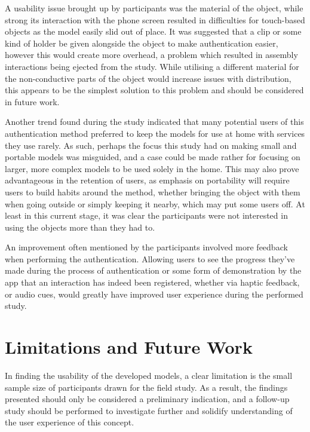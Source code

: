 \documentclass{l4proj}
\begin{document}
A usability issue brought up by participants was the material of the object, while strong its interaction with the phone screen resulted in difficulties for touch-based objects as the model easily slid out of place. It was suggested that a clip or some kind of holder be given alongside the object to make authentication easier, however this would create more overhead, a problem which resulted in assembly interactions being ejected from the study. While utilising a different material for the non-conductive parts of the object would increase issues with distribution, this appears to be the simplest solution to this problem and should be considered in future work.

Another trend found during the study indicated that many potential users of this authentication method preferred to keep the models for use at home with services they use rarely. As such, perhaps the focus this study had on making small and portable models was misguided, and a case could be made rather for focusing on larger, more complex models to be used solely in the home. This may also prove advantageous in the retention of users, as emphasis on portability will require users to build habits around the method, whether bringing the object with them when going outside or simply keeping it nearby, which may put some users off. At least in this current stage, it was clear the participants were not interested in using the objects more than they had to.

An improvement often mentioned by the participants involved more feedback when performing the authentication. Allowing users to see the progress they've made during the process of authentication or some form of demonstration by the app that an interaction has indeed been registered, whether via haptic feedback, or audio cues, would greatly have improved user experience during the performed study.

\section{Limitations and Future Work}
In finding the usability of the developed models, a clear limitation is the small sample size of participants drawn for the field study. As a result, the findings presented should only be considered a preliminary indication, and a follow-up study should be performed to investigate further and solidify understanding of the user experience of this concept.
\end{document}
